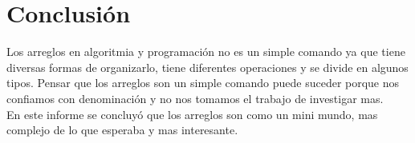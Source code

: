 \documentclass[journal]{IEEEtran}
\begin{document}
\section{Conclusión}
Los arreglos en algoritmia y programación no es un simple comando ya que tiene diversas formas de organizarlo, tiene diferentes operaciones y se divide en algunos tipos. Pensar que los arreglos son un simple comando puede suceder porque nos confiamos con denominación y no nos tomamos el trabajo de investigar mas.\\
En este informe se concluyó que los arreglos son como un mini mundo, mas complejo de lo que esperaba y mas interesante.
\end{document}
